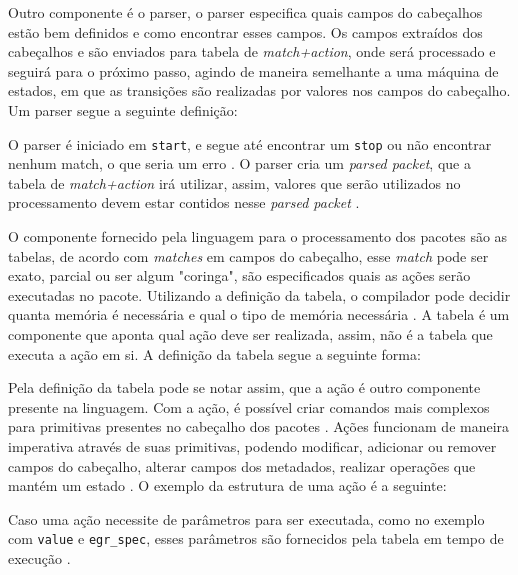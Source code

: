 \documentclass[
    12pt,
    openright, 
    oneside,
    a4paper,
    french,
    english,
    brazil
    ]{facom-ufu-abntex2}
\theoremstyle{definition}
\begin{document}


Outro componente é o parser, o parser especifica quais campos do cabeçalhos estão
bem definidos e como encontrar esses campos. Os campos extraídos dos cabeçalhos e 
são enviados para tabela de \emph{match+action}, onde será processado e seguirá
para o próximo passo, agindo de maneira semelhante a uma máquina de estados, em 
que as transições são realizadas por valores nos campos do cabeçalho. Um parser
segue a seguinte definição:



O parser é iniciado em \texttt{start}, e segue até encontrar um \texttt{stop} ou não
encontrar nenhum match, o que seria um erro \cite{bosshart2014p4}. O parser cria um 
\emph{parsed packet}, que a tabela de \emph{match+action} irá utilizar,
assim, valores que serão utilizados no processamento devem estar contidos nesse
\emph{parsed packet} \cite{p4USITutorial}.

O componente fornecido pela linguagem para o processamento dos pacotes são as tabelas,
de acordo com \emph{matches} em campos do cabeçalho, esse \emph{match} pode ser exato, parcial 
ou ser algum "coringa", são especificados quais as ações serão executadas no
pacote. Utilizando a definição da tabela, o compilador pode decidir quanta memória 
é necessária e qual o tipo de memória necessária \cite{bosshart2014p4}. A
tabela é um componente que aponta qual ação deve ser realizada, assim, não é a 
tabela que executa a ação em si. A definição da tabela segue a seguinte forma:



Pela definição da tabela pode se notar assim, que a ação é outro componente presente
na linguagem. Com a ação, é possível criar comandos mais complexos para primitivas
presentes no cabeçalho dos pacotes \cite{bosshart2014p4}. Ações funcionam de
maneira imperativa através de suas primitivas, podendo modificar, adicionar ou 
remover campos do cabeçalho, alterar campos dos metadados, realizar operações
que mantém um estado \cite{p4USITutorial}. O exemplo da estrutura de uma ação
é a seguinte:



Caso uma ação necessite de parâmetros para ser executada, como no exemplo com
\texttt{value} e \texttt{egr\_spec}, esses parâmetros são fornecidos pela tabela em tempo 
de execução \cite{bosshart2014p4}.
\end{document}

